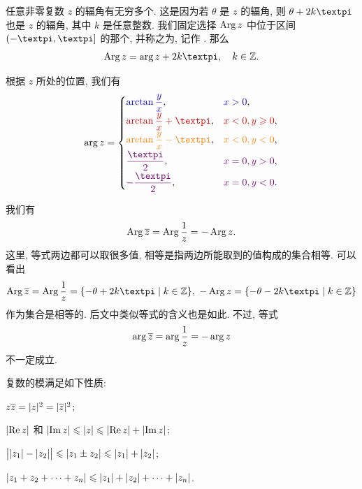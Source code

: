 任意非零复数 $z$ 的辐角有无穷多个.
这是因为若 $\theta$ 是 $z$ 的辐角, 则 $\theta+2k\cpi$ 也是 $z$ 的辐角, 其中 $k$ 是任意整数.
我们固定选择 $\operatorname{Arg} z$ 中位于区间 $(-\cpi,\cpi]$ 的那个, 并称之为, 记作 .
那么
\[
  \Arg z=\arg z+2k\cpi, \quad k\in\BZ.
\]

\marginpar{
  \vspace{-2\baselineskip}
  \small
  实际上我们可以任选长度为 $2\cpi$ 的半开半闭区间作为辐角主值范围. 常见的选择还有 $[0,2\cpi)$.
}

根据 $z$ 所处的位置, 我们有
\begin{equation}
  \label{eq:arg}
  \arg z=\begin{cases}
    {\color{main}\arctan\dfrac yx},&
      {\color{main}x>0},\\[4pt]
    {\color{second}\arctan\dfrac yx+\cpi},&
      {\color{second}x<0,y\ge0},\\[4pt]
    {\color{fifth}\arctan\dfrac yx-\cpi},&
      {\color{fifth}x<0,y<0},\\[4pt]
    {\color{third}\dfrac\cpi2},&
      {\color{third}x=0,y>0},\\[4pt]
    {\color{third}-\dfrac\cpi2},&
      {\color{third}x=0,y<0}.
  \end{cases}
\end{equation}


我们有
\[
  \operatorname{Arg} \overline z=\operatorname{Arg}\frac1z=-\operatorname{Arg} z.
\]
这里, 等式两边都可以取很多值, 相等是指两边所能取到的值构成的集合相等.
可以看出
\[
  \Arg\ov z=\Arg\frac1z=\{-\theta+2k\cpi\mid k\in\BZ\},
  \ 
  -\Arg z=\{-\theta-2k\cpi\mid k\in\BZ\}
\]
作为集合是相等的.
后文中类似等式的含义也是如此. 
不过, 等式
\[
  \arg\overline z=\arg\frac1z=-\arg z
\]
\alert{不一定成立}.

复数的模满足如下性质:
\begin{enuma}
  \item $z\overline z=\lvert z\rvert^2=\lvert\overline z\rvert^2$;
  \label{enum:modulus-zzbar}
  \item $\lvert\operatorname{Re} z\rvert$ 和 $\lvert\operatorname{Im} z\rvert\leqslant \lvert z\rvert\leqslant\lvert\operatorname{Re} z\rvert+\lvert\operatorname{Im} z\rvert$;
  \label{enum:re-im-less}
  \item $\bigl\vert\lvert z_1\rvert-\lvert z_2\rvert\bigr\vert\leqslant\lvert z_1\pm z_2\rvert\leqslant\lvert z_1\rvert+\lvert z_2\rvert$;
  \label{enum:modulus-triangle-inequality}
  \item $\lvert z_1+z_2+\cdots+z_n\rvert\leqslant\lvert z_1\rvert+\lvert z_2\rvert+\cdots+\lvert z_n\rvert$.
  \label{enum:modulus-nangle-inequality}
\end{enuma}

